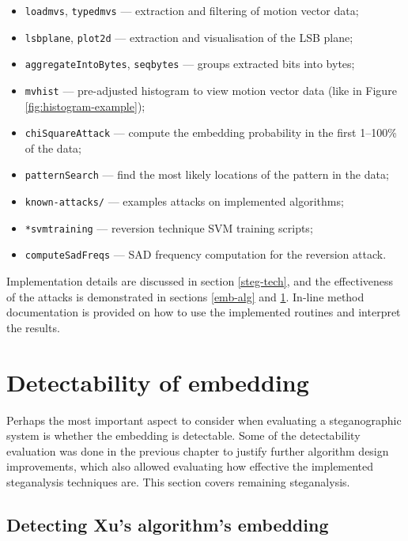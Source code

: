 \documentclass[12pt,british,twoside,notitlepage,usenames,dvipsnames,hypens,final]{report}
\numberwithin{equation}{section}
\numberwithin{figure}{section}
\begin{document}
\begin{multicols}{2}
\begin{itemize}
\item \texttt{loadmvs}, \texttt{typedmvs} --- extraction and filtering of motion vector data;
\item \texttt{lsbplane}, \texttt{plot2d} --- extraction and visualisation of the LSB plane;
\item \texttt{aggregateIntoBytes}, \texttt{seqbytes} --- groups extracted bits into bytes;
\item \texttt{mvhist} --- pre-adjusted histogram to view motion vector data (like in Figure \ref{fig:histogram-example});
\item \texttt{chiSquareAttack} --- compute the embedding probability in the first 1--100\% of the data;\\
\item \texttt{patternSearch} --- find the most likely locations of the pattern in the data;
\item \texttt{known-attacks/} --- examples attacks on implemented algorithms;
\item \texttt{*svmtraining} --- reversion technique SVM training scripts;
\item \texttt{computeSadFreqs} --- SAD frequency computation for the reversion attack.
\end{itemize}
\end{multicols}

Implementation details are discussed in section \ref{steg-tech}, and the effectiveness of the attacks is demonstrated in sections \ref{emb-alg} and \ref{rem-detect-eval}. In-line method documentation is provided on how to use the implemented routines and interpret the results. 

\section{Detectability of embedding}
\label{rem-detect-eval}

Perhaps the most important aspect to consider when evaluating a steganographic system is whether the embedding is detectable. Some of the detectability evaluation was done in the previous chapter to justify further algorithm design improvements, which also allowed evaluating how effective the implemented steganalysis techniques are. This section covers remaining steganalysis.

\subsection{Detecting Xu's algorithm's embedding}
\label{breaking-xu}
\end{document}
